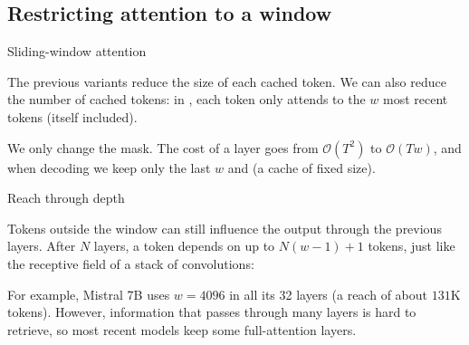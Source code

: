 \documentclass[11pt,aspectratio=169]{beamer}
\begin{document}
\subsection{Restricting attention to a window}

\begin{frame}{Sliding-window attention}
    \setlength{\parskip}{6pt}

    The previous variants reduce the size of each cached token. We can also
    reduce the number of cached tokens: in ,
    each token only attends to the $w$ most recent tokens (itself included).

    \centering
    
    \par\vspace{-0.8em}
    \justifying

    We only change the mask. The cost of a layer goes from
    $\mathcal{O}(T^2)$ to $\mathcal{O}(Tw)$, and when decoding we keep only
    the last $w$  and  (a cache of fixed size).


\end{frame}

\begin{frame}{Reach through depth}
    \setlength{\parskip}{6pt}

    Tokens outside the window can still influence the output through the
    previous layers. After $N$ layers, a token depends on up to $N(w-1)+1$
    tokens, just like the receptive field of a stack of convolutions:

    \centering
    
    \par\vspace{-0.8em}
    \justifying

    For example, Mistral 7B uses $w=4096$ in all its 32 layers (a reach of
    about $131$K tokens). However, information that passes through many layers
    is hard to retrieve, so most recent models keep some full-attention layers.


\end{frame}
\end{document}
